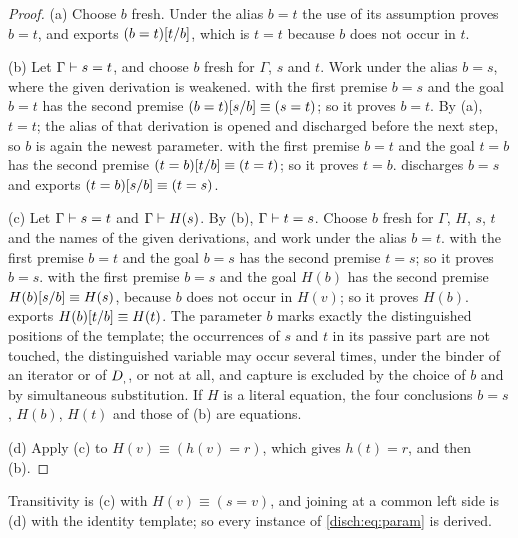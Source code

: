 \begin{proof}
(a) Choose $b$ fresh. Under the alias $b=t$ the use of its assumption
proves $b=t$, and  exports $(b=t)[t/b]$, which is
$t=t$ because $b$ does not occur in $t$.

(b) Let $\Gamma\vdash s=t$, and choose $b$ fresh for $\Gamma$, $s$ and
$t$. Work under the alias $b=s$, where the given derivation is weakened.
 with the first premise $b=s$ and the goal $b=t$ has the
second premise $(b=t)[s/b]\equiv(s=t)$; so it proves $b=t$. By (a),
$t=t$; the alias of that derivation is opened and discharged before the
next step, so $b$ is again the newest parameter.  with the
first premise $b=t$ and the goal $t=b$ has the second premise
$(t=b)[t/b]\equiv(t=t)$; so it proves $t=b$. 
discharges $b=s$ and exports $(t=b)[s/b]\equiv(t=s)$.

(c) Let $\Gamma\vdash s=t$ and $\Gamma\vdash H(s)$. By (b),
$\Gamma\vdash t=s$. Choose $b$ fresh for $\Gamma$, $H$, $s$, $t$ and the
names of the given derivations, and work under the alias $b=t$.
 with the first premise $b=t$ and the goal $b=s$ has the
second premise $t=s$; so it proves $b=s$.  with the first
premise $b=s$ and the goal $H(b)$ has the second premise
$H(b)[s/b]\equiv H(s)$, because $b$ does not occur in $H(v)$; so it
proves $H(b)$.  exports $H(b)[t/b]\equiv H(t)$. The
parameter $b$ marks exactly the distinguished positions of the template;
the occurrences of $s$ and $t$ in its passive part are not touched, the
distinguished variable may occur several times, under the binder of an
iterator or of $D_{,}$, or not at all, and capture is excluded by the
choice of $b$ and by simultaneous substitution. If $H$ is a literal
equation, the four conclusions $b=s$, $H(b)$, $H(t)$ and those of (b) are
equations.

(d) Apply (c) to $H(v)\equiv(h(v)=r)$, which gives $h(t)=r$, and then (b).
\end{proof}

Transitivity is (c) with $H(v)\equiv(s=v)$, and joining at a common left
side is (d) with the identity template; so every instance of
 \eqref{disch:eq:param} is derived.

